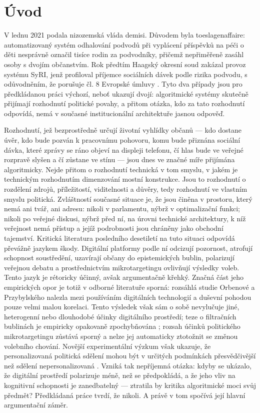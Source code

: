 \chapter*{Úvod}

V lednu 2021 podala nizozemská vláda demisi.
Důvodem byla toeslagenaffaire: automatizovaný systém odhalování podvodů při vyplácení příspěvků na péči o děti nesprávně označil tisíce rodin za podvodníky, přičemž nepřiměřeně zasáhl osoby s dvojím občanstvím.
Rok předtím Haagský okresní soud zakázal provoz systému SyRI, jenž profiloval příjemce sociálních dávek podle rizika podvodu, s odůvodněním, že porušuje čl. 8 Evropské úmluvy \parencite{RechtbankSyRI20}.
Tyto dva případy jsou pro předkládanou práci výchozí, neboť ukazují dvojí: algoritmické systémy skutečně přijímají rozhodnutí politické povahy, a přitom otázka, kdo za tato rozhodnutí odpovídá, nemá v současné institucionální architektuře jasnou odpověď.


Rozhodnutí, jež bezprostředně určují životní vyhlídky občanů — kdo dostane úvěr, kdo bude pozván k pracovnímu pohovoru, komu bude přiznána sociální dávka, které zprávy se ráno objeví na displeji telefonu, čí hlas bude ve veřejné rozpravě slyšen a čí zůstane ve stínu — jsou dnes ve značné míře přijímána algoritmicky.
Nejde přitom o rozhodnutí technická v tom smyslu, v jakém je technickým rozhodnutím dimenzování mostní konstrukce.
Jsou to rozhodnutí o rozdělení zdrojů, příležitostí, viditelnosti a důvěry, tedy rozhodnutí ve vlastním smyslu politická.
Zvláštností současné situace je, že jsou činěna v prostoru, který nemá ani tvář, ani adresu: nikoli v parlamentu, nýbrž v optimalizační funkci; nikoli po veřejné diskusi, nýbrž před ní, na úrovni technické architektury, k níž veřejnost nemá přístup a jejíž podrobnosti jsou chráněny jako obchodní tajemství.
Kritická literatura posledního desetiletí na tuto situaci odpovídá převážně jazykem škody. Digitální platformy podle ní odcizují pozornost, atrofují schopnost soustředění, uzavírají občany do epistemických bublin, polarizují veřejnou debatu a prostřednictvím mikrotargetingu ovlivňují výsledky voleb.
Tento jazyk je rétoricky účinný, avšak argumentačně křehký.
Značná část jeho empirických opor je totiž v odborné literatuře sporná: rozsáhlá studie Orbenové a Przybylského \parencite{OrbenPrzybylski19} nalezla mezi používáním digitálních technologií a duševní pohodou pouze velmi malou korelaci. Tento výsledek však sám o sobě nevylučuje jiné, heterogenní nebo dlouhodobé účinky digitálního prostředí;
teze o filtračních bublinách je empiricky opakovaně zpochybňována \parencite{Bruns19,Guess23};
rozsah účinků politického mikrotargetingu zůstává sporný a nelze jej automaticky ztotožnit se změnou volebního chování. Novější experimentální výzkum však ukazuje, že personalizovaná politická sdělení mohou být v určitých podmínkách přesvědčivější než sdělení nepersonalizovaná \parencite{SimchonEdwardsLewandowsky24}.
Vzniká tak nepříjemná otázka: kdyby se ukázalo, že digitální prostředí polarizuje méně, než se předpokládá, a že jeho vliv na kognitivní schopnosti je zanedbatelný — ztratila by kritika algoritmické moci svůj předmět?
Předkládaná práce tvrdí, že nikoli.
A právě v tom spočívá její hlavní argumentační záměr.


